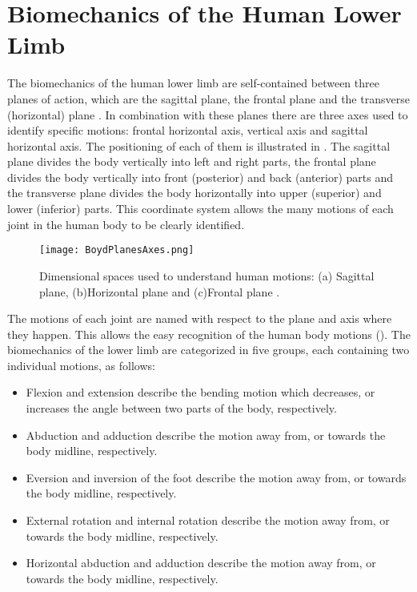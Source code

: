 \section{Biomechanics of the Human Lower Limb}

The biomechanics of the human lower limb are self-contained between three planes of action, which are the sagittal plane, the frontal plane and the transverse (horizontal) plane \cite{PhysicalSolutions2016}. In combination with these planes there are three axes used to identify specific motions: frontal horizontal axis, vertical axis and sagittal horizontal axis. The positioning of each of them is illustrated in . The sagittal plane divides the body vertically into left and right parts, the frontal plane divides the body vertically into front (posterior) and back (anterior) parts and the transverse plane divides the body horizontally into upper (superior) and lower (inferior) parts. This coordinate system allows the many motions of each joint in the human body to be clearly identified.

\begin{figure}[htbp!]
	\centering
	\texttt{[image: BoydPlanesAxes.png]}
	\caption[Dimensional spaces used to understand human motions: (a) Sagittal plane, (b)Horizontal plane and (c)Frontal plane.]{Dimensional spaces used to understand human motions: (a) Sagittal plane, (b)Horizontal plane and (c)Frontal plane \cite{PhysicalSolutions2016}. }
	\label{fig:body_planes_axes}
\end{figure}

\newpage
The motions of each joint are named with respect to the plane and axis where they happen. This allows the easy recognition of the human body motions (). The biomechanics of the lower limb are categorized in five groups, each containing two individual motions, as follows:
\begin{itemize}
	\item Flexion and extension describe the bending motion which decreases, or increases the angle between two parts of the body, respectively.
	\item Abduction and adduction describe the motion away from, or towards the body midline, respectively.
	\item Eversion and inversion of the foot describe the motion away from, or towards the body midline, respectively.
	\item External rotation and internal rotation describe the motion away from, or towards the body midline, respectively.
	\item Horizontal abduction and adduction describe the motion away from, or towards the body midline, respectively.
\end{itemize}

